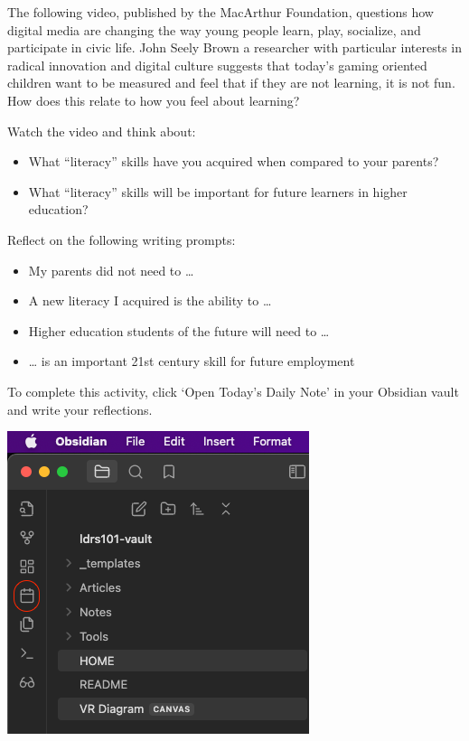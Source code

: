 \documentclass[
]{book}
\providecommand{\tightlist}{%
  \setlength{\itemsep}{0pt}\setlength{\parskip}{0pt}}
\theoremstyle{definition}
\theoremstyle{definition}
\theoremstyle{definition}
\theoremstyle{definition}
\theoremstyle{remark}
\begin{document}
\begin{reflect}
The following video, published by the MacArthur Foundation, questions how digital media are changing the way young people learn, play, socialize, and participate in civic life. John Seely Brown a researcher with particular interests in radical innovation and digital culture suggests that today's gaming oriented children want to be measured and feel that if they are not learning, it is not fun. How does this relate to how you feel about learning?

Watch the video and think about:

\begin{itemize}
\tightlist
\item
  What ``literacy'' skills have you acquired when compared to your parents?\\
\item
  What ``literacy'' skills will be important for future learners in higher education?
\end{itemize}

Reflect on the following writing prompts:

\begin{itemize}
\tightlist
\item
  My parents did not need to \ldots{}\\
\item
  A new literacy I acquired is the ability to \ldots{}\\
\item
  Higher education students of the future will need to \ldots{}\\
\item
  \ldots{} is an important 21st century skill for future employment
\end{itemize}

To complete this activity, click `Open Today's Daily Note' in your Obsidian vault and write your reflections.

\includegraphics{assets/u1/tdn.png}


\end{reflect}
\end{document}
